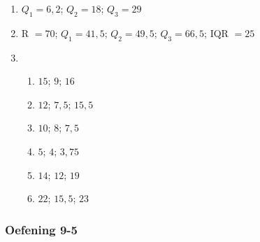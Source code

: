 {\begin{multicols}{3}
\begin{enumerate}[noitemsep, label=\textbf{\arabic*}.]
  \item $Q_1 = 6,2$; $ Q_2 = 18$; $Q_3 = 29$%

  \item R $= 70$; $Q_1 = 41,5$; $Q_2 = 49,5$; $Q_3 = 66,5$; IQR $= 25$  %

  \item %
\begin{enumerate}[noitemsep, label=\textbf{(\alph*)} ]
    \item $15$; $9$; $16$%
    \item $12$;  $7,5$; $15,5$%
    \item $10$; $8$; $7,5$%
    \item $5$; $4$; $3,75$ %
    \item $14$; $12$; $19$ %
    \item $22$; $15,5$; $23$%
    \end{enumerate}

  \end{enumerate}
\subsubsection*{Oefening 9-5} %
\begin{enumerate} [noitemsep, label=\textbf{\arabic*}.]


\end{enumerate}
\end{multicols}}
